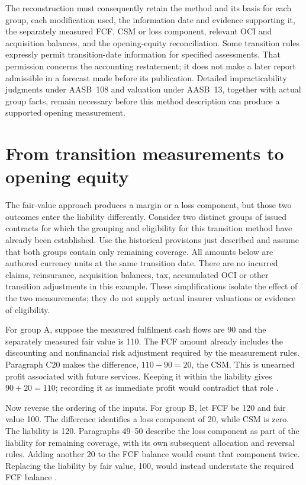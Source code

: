 The reconstruction must consequently retain the method and its basis for each
group, each modification used, the information date and evidence supporting
it, the separately measured FCF, CSM or loss component, relevant OCI and
acquisition balances, and the opening-equity reconciliation. Some transition
rules expressly permit transition-date information for specified assessments.
That permission concerns the accounting restatement; it does not make a later
report admissible in a forecast made before its publication. Detailed
impracticability judgments under AASB~108 and valuation under AASB~13, together
with actual group facts, remain necessary before this method description can
produce a supported opening measurement.


\clearpage
\section{From transition measurements to opening equity}
\label{sec:insurance-transition-balances}

The fair-value approach produces a margin or a loss component, but those two
outcomes enter the liability differently. Consider two distinct groups of
issued contracts for which the grouping and eligibility for this transition
method have already been established. Use the historical provisions just
described and assume that both groups contain only remaining coverage. All
amounts below are authored currency units at the same transition date. There
are no incurred claims, reinsurance, acquisition balances, tax, accumulated
OCI or other transition adjustments in this example. These simplifications
isolate the effect of the two measurements; they do not supply actual insurer
valuations or evidence of eligibility.

For group A, suppose the measured fulfilment cash flows are 90 and the
separately measured fair value is 110. The FCF amount already includes the
discounting and nonfinancial risk adjustment required by the measurement
rules. Paragraph C20 makes the difference, $110-90=20$, the CSM. This is
unearned profit associated with future services. Keeping it within the
liability gives $90+20=110$; recording it as immediate profit would contradict
that role \citep[paragraphs 32--38, 40(a) and C20]{aasb17}.

Now reverse the ordering of the inputs. For group B, let FCF be 120 and fair
value 100. The difference identifies a loss component of 20, while CSM is
zero. The liability is 120. Paragraphs 49--50 describe the loss component as
part of the liability for remaining coverage, with its own subsequent
allocation and reversal rules. Adding another 20 to the FCF balance would
count that component twice. Replacing the liability by fair value, 100,
would instead understate the required FCF balance
\citep[paragraphs 40, 47, 49--50 and C20]{aasb17}.


